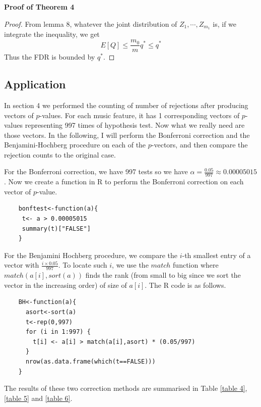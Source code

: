 \documentclass[12pt]{article}
\theoremstyle{plain}
\theoremstyle{definition}
\theoremstyle{remark}
\begin{document}
\textbf{Proof of Theorem 4}
\begin{proof} \cite{5.3}\cite{5.7}
From lemma 8, whatever the joint distribution of $Z_1,\cdots,Z_{m_1}$ is,  if we integrate the inequality, we get
\[E[Q]\leq\frac{m_0}{m}q^*\leq q^*
\]
Thus the FDR is bounded by $q^*$.
\end{proof}

\newpage
\subsection{Application}
In section 4 we performed the counting of number of rejections after producing vectors of $p$-values. For each music feature, it has 1 corresponding vectors of $p$-values representing 997 times of hypothesis test. Now what we really need are those vectors. In the following, I will perform the Bonferroni correction and the Benjamini-Hochberg procedure on each of the $p$-vectors, and then compare the rejection counts to the original case.

For the Bonferroni correction, we have 997 tests so we have $\alpha=\frac{0.05}{997}\approx 0.00005015$. Now we create a function in R to perform the Bonferroni correction on each vector of $p$-value.
\begin{verbatim}
    bonftest<-function(a){
     t<- a > 0.00005015
     summary(t)["FALSE"]
    }
\end{verbatim}

For the Benjamini Hochberg procedure, we compare the $i$-th smallest entry of a vector with $\frac{i\times 0.05}{997}$. To locate such $i$, we use the $match$ function where $match(a[i],sort(a))$ finds the rank (from small to big since we sort the vector in the increasing order) of size of $a[i]$. The R code is as follows.
\begin{verbatim}
    BH<-function(a){
      asort<-sort(a)
      t<-rep(0,997)
      for (i in 1:997) {
        t[i] <- a[i] > match(a[i],asort) * (0.05/997)
      }
      nrow(as.data.frame(which(t==FALSE)))
    }
\end{verbatim}

The results of these two correction methods are summarised in Table \ref{table 4}, \ref{table 5} and \ref{table 6}.
\end{document}

